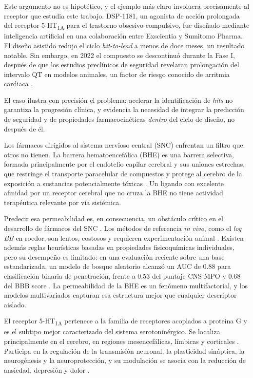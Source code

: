 Este argumento no es hipotético, y el ejemplo más claro involucra precisamente
al receptor que estudia este trabajo. DSP-1181, un agonista de acción prolongada
del receptor 5-HT\textsubscript{1A} para el trastorno obsesivo-compulsivo, fue
diseñado mediante inteligencia artificial en una colaboración entre Exscientia y
Sumitomo Pharma. El diseño asistido redujo el ciclo \textit{hit-to-lead} a menos
de doce meses, un resultado notable. Sin embargo, en 2022 el compuesto se
descontinuó durante la Fase I, después de que los estudios preclínicos de
seguridad revelaran prolongación del intervalo QT en modelos animales, un factor
de riesgo conocido de arritmia cardiaca \cite{mao_artificial_2026}.
 
El caso ilustra con precisión el problema: acelerar la identificación de
\textit{hits} no garantiza la progresión clínica, y evidencia la necesidad de
integrar la predicción de seguridad y de propiedades farmacocinéticas
\emph{dentro} del ciclo de diseño, no después de él.
 

 
Los fármacos dirigidos al sistema nervioso central (SNC) enfrentan un filtro que
otros no tienen. La barrera hematoencefálica (BHE) es una barrera selectiva,
formada principalmente por el endotelio capilar cerebral y sus uniones
estrechas, que restringe el transporte paracelular de compuestos y protege al
cerebro de la exposición a sustancias potencialmente tóxicas
\cite{faramarzi_development_2022}. Un ligando con excelente afinidad por un receptor
cerebral que no cruza la BHE no tiene actividad terapéutica relevante por vía
sistémica.
 
Predecir esa permeabilidad es, en consecuencia, un obstáculo crítico en el
desarrollo de fármacos del SNC \cite{spielvogel_enhancing_2025a}. Los métodos de
referencia \textit{in vivo}, como el \textit{log\,BB} en roedor, son lentos,
costosos y requieren experimentación animal \cite{faramarzi_development_2022}. Existen
además reglas heurísticas basadas en propiedades fisicoquímicas individuales,
pero su desempeño es limitado: en una evaluación reciente sobre una base
estandarizada, un modelo de bosque aleatorio alcanzó un AUC de 0.88 para
clasificación binaria de penetración, frente a 0.53 del puntaje CNS MPO y 0.68
del BBB score \cite{spielvogel_enhancing_2025a}. La permeabilidad de la BHE es un
fenómeno multifactorial, y los modelos multivariados capturan esa estructura
mejor que cualquier descriptor aislado.
 

El receptor 5-HT\textsubscript{1A} pertenece a la familia de receptores acoplados
a proteína G y es el subtipo mejor caracterizado del sistema serotoninérgico. Se
localiza principalmente en el cerebro, en regiones mesencefálicas, límbicas y
corticales \cite{czub_automlbased_2022}. Participa en la regulación de la transmisión
neuronal, la plasticidad sináptica, la neurogénesis y la neuroprotección, y su
modulación se asocia con la reducción de ansiedad, depresión y dolor
\cite{czub_curated_2021}.
 
